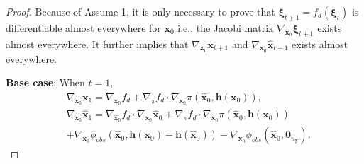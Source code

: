 \documentclass[conference]{IEEEtran}
\newtheorem{proof}{\bf Proof}
\newcommand{\myvec}[1]{\boldsymbol{#1}}
\begin{document}
\begin{proof}\label{proof:differentiable}
    Because of Assume 1,  
    it is only necessary to prove that 
    $\myvec{\xi}_{t+1} = f_{d}(\myvec{\xi}_{t})$ is differentiable almost everywhere 
    for $\myvec{x}_{0}$ i.e., the Jacobi matrix $\nabla_{\myvec{x}_{0}}\myvec{\xi}_{t+1}$ 
    exists almost everywhere. It further implies that 
    $\nabla_{\myvec{x}_{0}}\myvec{x}_{t+1}$ and 
    $\nabla_{\myvec{x}_{0}}\hat{\myvec{x}}_{t+1}$ exists almost everywhere. 
  
    \textbf{Base case}: When $t = 1$, 
    \begin{subequations}
      \begin{align}
      &\nabla_{\myvec{x}_{0}}\myvec{x}_{1} = \nabla_{\myvec{x}_{0}}f_{d} 
      + \nabla_{\pi}f_{d} \cdot 
      \nabla_{\myvec{x}_{0}}\pi(\hat{\myvec{x}}_{0}, \myvec{h}(\myvec{x}_{0})), \label{eq:differentiable 1}\\
      &\nabla_{\myvec{x}_{0}}\hat{\myvec{x}}_{1} = \nabla_{\hat{\myvec{x}}_{0}}f_{d} 
      \cdot \nabla_{\myvec{x}_{0}}\hat{\myvec{x}}_{0} + \nabla_{\pi}f_{d} \cdot 
      \nabla_{\myvec{x}_{0}}\pi(\hat{\myvec{x}}_{0}, \myvec{h}(\myvec{x}_{0})) \nonumber \\
      & + \nabla_{\myvec{x}_{0}}\phi_{obs} 
      (\hat{\myvec{x}}_{0}, \myvec{h}(\myvec{x}_{0}) - \myvec{h}(\hat{\myvec{x}}_{0}))
      - \nabla_{\myvec{x}_{0}}\phi_{obs} (\hat{\myvec{x}}_{0}, \myvec{0}_{n_{\myvec{y}}}). \label{eq:differentiable 2}
      \end{align}
    \end{subequations}
    

\end{proof}
\end{document}
